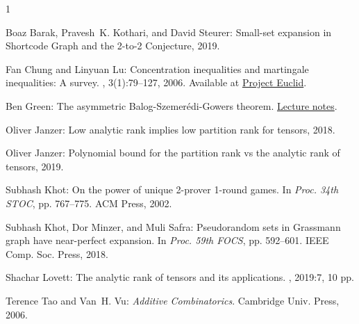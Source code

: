 \documentclass[11pt]{article}
\numberwithin{equation}{section}
\theoremstyle{definition}
\theoremstyle{plain}
\begin{document}
\begin{thebibliography}{1}

{\sc Boaz Barak, Pravesh~K. Kothari, and David Steurer}: Small-set expansion in
  {S}hortcode {G}raph and the 2-to-2 {C}onjecture, 2019.

{\sc Fan Chung and Linyuan Lu}: Concentration inequalities and martingale
  inequalities: {A} survey.
, 3(1):79--127, 2006.
\newblock Available at
  \href{https://projecteuclid.org/euclid.im/1175266369}{Project Euclid}.

{\sc Ben Green}: The asymmetric {Balog}-{Szemer\'edi}-{Gowers} theorem.
\newblock
  \href{http://people.maths.ox.ac.uk/greenbj/papers/asym-BSG.pdf}{Lecture
  notes}.

{\sc Oliver Janzer}: Low analytic rank implies low partition rank for tensors,
  2018.

{\sc Oliver Janzer}: Polynomial bound for the partition rank vs the analytic
  rank of tensors, 2019.

{\sc Subhash Khot}: On the power of unique 2-prover 1-round games.
\newblock In {\em Proc. 34th STOC}, pp. 767--775. ACM Press, 2002.
\newblock [\epfmtdoi{10.1145/509907.510017}]

{\sc Subhash Khot, Dor Minzer, and Muli Safra}: Pseudorandom sets in
  {Grassmann} graph have near-perfect expansion.
\newblock In {\em Proc. 59th FOCS}, pp. 592--601. IEEE Comp. Soc. Press, 2018.

{\sc Shachar Lovett}: The analytic rank of tensors and its applications.
, 2019:7, 10 pp.

{\sc Terence Tao and Van~H. Vu}: {\em Additive Combinatorics}.
\newblock Cambridge Univ. Press, 2006.

\end{thebibliography}
\end{document}
